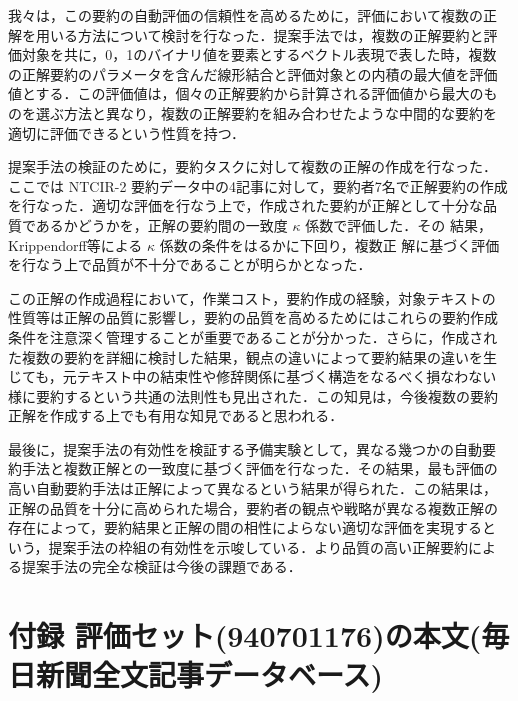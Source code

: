 我々は，この要約の自動評価の信頼性を高めるために，評価において複数の正
解を用いる方法について検討を行なった．提案手法では，複数の正解要約と評
価対象を共に，0，1のバイナリ値を要素とするベクトル表現で表した時，複数
の正解要約のパラメータを含んだ線形結合と評価対象との内積の最大値を評価
値とする．この評価値は，個々の正解要約から計算される評価値から最大のも
のを選ぶ方法と異なり，複数の正解要約を組み合わせたような中間的な要約を
適切に評価できるという性質を持つ．

提案手法の検証のために，要約タスクに対して複数の正解の作成を行なった．
ここでは NTCIR-2 要約データ中の4記事に対して，要約者7名で正解要約の作成
を行なった．適切な評価を行なう上で，作成された要約が正解として十分な品
質であるかどうかを，正解の要約間の一致度 $\kappa$ 係数で評価した．その
結果，Krippendorff等による $\kappa$ 係数の条件をはるかに下回り，複数正
解に基づく評価を行なう上で品質が不十分であることが明らかとなった．

この正解の作成過程において，作業コスト，要約作成の経験，対象テキストの
性質等は正解の品質に影響し，要約の品質を高めるためにはこれらの要約作成
条件を注意深く管理することが重要であることが分かった．さらに，作成され
た複数の要約を詳細に検討した結果，観点の違いによって要約結果の違いを生
じても，元テキスト中の結束性や修辞関係に基づく構造をなるべく損なわない
様に要約するという共通の法則性も見出された．この知見は，今後複数の要約
正解を作成する上でも有用な知見であると思われる．

最後に，提案手法の有効性を検証する予備実験として，異なる幾つかの自動要
約手法と複数正解との一致度に基づく評価を行なった．その結果，最も評価の
高い自動要約手法は正解によって異なるという結果が得られた．この結果は，
正解の品質を十分に高められた場合，要約者の観点や戦略が異なる複数正解の
存在によって，要約結果と正解の間の相性によらない適切な評価を実現すると
いう，提案手法の枠組の有効性を示唆している．より品質の高い正解要約によ
る提案手法の完全な検証は今後の課題である．







\section*{付録 評価セット(940701176)の本文(毎日新聞全文記事データベース)}

